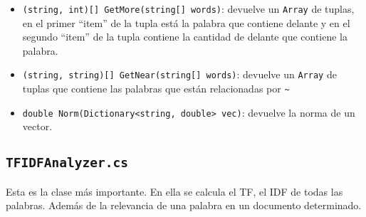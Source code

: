 \documentclass[a4paper, 12pt]{article}
\begin{document}
\begin{itemize}
	\item {\tt (string, int)[] GetMore(string[] words)}: devuelve un {\tt Array} de tuplas, en el primer ``item'' de la tupla
	      está la palabra que contiene {\tt *} delante y en el segundo ``item'' de la tupla contiene la cantidad de {\tt *} delante
	      que contiene la palabra.
	\item {\tt (string, string)[] GetNear(string[] words)}: devuelve un {\tt Array} de tuplas que contiene las palabras que están relacionadas por
	      {\tt \~{}}
	\item {\tt double Norm(Dictionary<string, double> vec)}: devuelve la norma de un vector.
\end{itemize}

\subsection*{\tt TFIDFAnalyzer.cs}

Esta es la clase más importante. En ella se calcula el TF, el IDF de todas las
palabras. Además de la relevancia de una palabra en un documento determinado.
\end{document}
